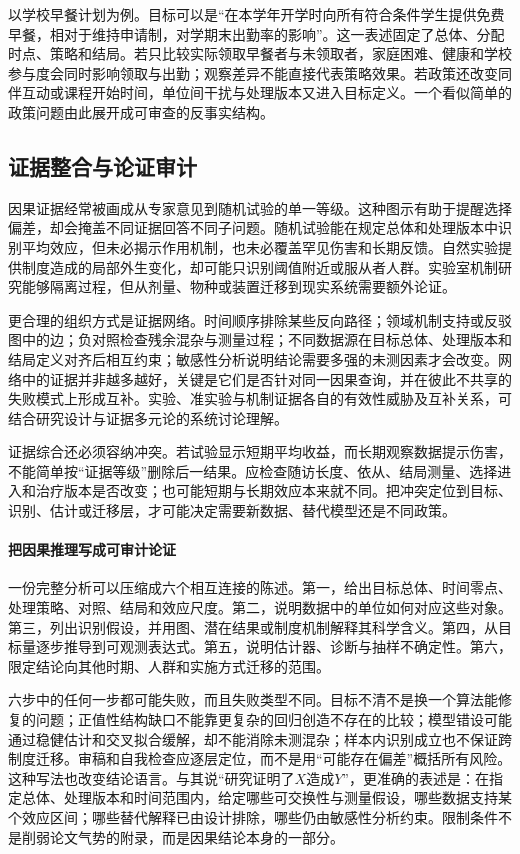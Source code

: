 以学校早餐计划为例。目标可以是“在本学年开学时向所有符合条件学生提供免费早餐，相对于维持申请制，对学期末出勤率的影响”。这一表述固定了总体、分配时点、策略和结局。若只比较实际领取早餐者与未领取者，家庭困难、健康和学校参与度会同时影响领取与出勤；观察差异不能直接代表策略效果。若政策还改变同伴互动或课程开始时间，单位间干扰与处理版本又进入目标定义。一个看似简单的政策问题由此展开成可审查的反事实结构。

\subsection{证据整合与论证审计}

因果证据经常被画成从专家意见到随机试验的单一等级。这种图示有助于提醒选择偏差，却会掩盖不同证据回答不同子问题。随机试验能在规定总体和处理版本中识别平均效应，但未必揭示作用机制，也未必覆盖罕见伤害和长期反馈。自然实验提供制度造成的局部外生变化，却可能只识别阈值附近或服从者人群。实验室机制研究能够隔离过程，但从剂量、物种或装置迁移到现实系统需要额外论证。

更合理的组织方式是证据网络。时间顺序排除某些反向路径；领域机制支持或反驳图中的边；负对照检查残余混杂与测量过程；不同数据源在目标总体、处理版本和结局定义对齐后相互约束；敏感性分析说明结论需要多强的未测因素才会改变。网络中的证据并非越多越好，关键是它们是否针对同一因果查询，并在彼此不共享的失败模式上形成互补。实验、准实验与机制证据各自的有效性威胁及互补关系，可结合研究设计与证据多元论的系统讨论理解\parencite{shadish2002,illarirusso2014}。

证据综合还必须容纳冲突。若试验显示短期平均收益，而长期观察数据提示伤害，不能简单按“证据等级”删除后一结果。应检查随访长度、依从、结局测量、选择进入和治疗版本是否改变；也可能短期与长期效应本来就不同。把冲突定位到目标、识别、估计或迁移层，才可能决定需要新数据、替代模型还是不同政策。

\paragraph{把因果推理写成可审计论证}

一份完整分析可以压缩成六个相互连接的陈述。第一，给出目标总体、时间零点、处理策略、对照、结局和效应尺度。第二，说明数据中的单位如何对应这些对象。第三，列出识别假设，并用图、潜在结果或制度机制解释其科学含义。第四，从目标量逐步推导到可观测表达式。第五，说明估计器、诊断与抽样不确定性。第六，限定结论向其他时期、人群和实施方式迁移的范围。

六步中的任何一步都可能失败，而且失败类型不同。目标不清不是换一个算法能修复的问题；正值性结构缺口不能靠更复杂的回归创造不存在的比较；模型错设可能通过稳健估计和交叉拟合缓解，却不能消除未测混杂；样本内识别成立也不保证跨制度迁移。审稿和自我检查应逐层定位，而不是用“可能存在偏差”概括所有风险。
这种写法也改变结论语言。与其说“研究证明了$X$造成$Y$”，更准确的表述是：在指定总体、处理版本和时间范围内，给定哪些可交换性与测量假设，哪些数据支持某个效应区间；哪些替代解释已由设计排除，哪些仍由敏感性分析约束。限制条件不是削弱论文气势的附录，而是因果结论本身的一部分。

